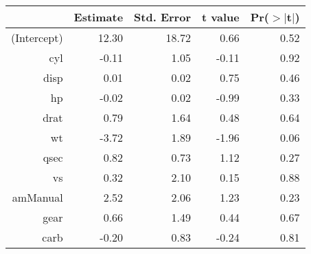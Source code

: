 \begin{tabular}{rrrrr}
  \hline
 & Estimate & Std. Error & t value & Pr($>$$|$t$|$) \\ 
  \hline
(Intercept) & 12.30 & 18.72 & 0.66 & 0.52 \\ 
  cyl & -0.11 & 1.05 & -0.11 & 0.92 \\ 
  disp & 0.01 & 0.02 & 0.75 & 0.46 \\ 
  hp & -0.02 & 0.02 & -0.99 & 0.33 \\ 
  drat & 0.79 & 1.64 & 0.48 & 0.64 \\ 
  wt & -3.72 & 1.89 & -1.96 & 0.06 \\ 
  qsec & 0.82 & 0.73 & 1.12 & 0.27 \\ 
  vs & 0.32 & 2.10 & 0.15 & 0.88 \\ 
  amManual & 2.52 & 2.06 & 1.23 & 0.23 \\ 
  gear & 0.66 & 1.49 & 0.44 & 0.67 \\ 
  carb & -0.20 & 0.83 & -0.24 & 0.81 \\ 
   \hline
\end{tabular}
